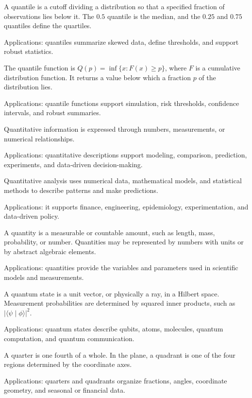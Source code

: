 A quantile is a cutoff dividing a distribution so that a specified fraction of observations lies below it. The $0.5$ quantile is the median, and the $0.25$ and $0.75$ quantiles define the quartiles. \par\noindent Applications: quantiles summarize skewed data, define thresholds, and support robust statistics.

The quantile function is $Q(p)=\inf\{x:F(x)\geq p\}$, where $F$ is a cumulative distribution function. It returns a value below which a fraction $p$ of the distribution lies. \par\noindent Applications: quantile functions support simulation, risk thresholds, confidence intervals, and robust summaries.

Quantitative information is expressed through numbers, measurements, or numerical relationships. \par\noindent Applications: quantitative descriptions support modeling, comparison, prediction, experiments, and data-driven decision-making.

Quantitative analysis uses numerical data, mathematical models, and statistical methods to describe patterns and make predictions. \par\noindent Applications: it supports finance, engineering, epidemiology, experimentation, and data-driven policy.

A quantity is a measurable or countable amount, such as length, mass, probability, or number. Quantities may be represented by numbers with units or by abstract algebraic elements. \par\noindent Applications: quantities provide the variables and parameters used in scientific models and measurements.

A quantum state is a unit vector, or physically a ray, in a Hilbert space. Measurement probabilities are determined by squared inner products, such as $|\langle\psi\mid\phi\rangle|^2$. \par\noindent Applications: quantum states describe qubits, atoms, molecules, quantum computation, and quantum communication.

A quarter is one fourth of a whole. In the plane, a quadrant is one of the four regions determined by the coordinate axes. \par\noindent Applications: quarters and quadrants organize fractions, angles, coordinate geometry, and seasonal or financial data.

